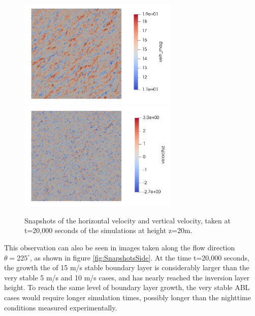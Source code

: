 \begin{figure}[hbt!]
  \includegraphics[width=3.0in]{figures/snapshots/15ms/velh_mag_z20.png}
  \includegraphics[width=3.0in]{figures/snapshots/15ms/velz_z20.png} \\
  \caption{ \label{fig:SnapshotsZ20} Snapshots of the horizontal
    velocity and vertical velocity, taken at t=20,000 seconds of the
    simulations at height z=20m.}
\end{figure}

This observation can also be seen in images taken along the flow
direction $\theta=225^\circ$, as shown in figure
\ref{fig:SnapshotsSide}.  At the time t=20,000 seconds, the growth the
of 15 m/s stable boundary layer is considerably larger than the very
stable 5 m/s and 10 m/s cases, and has nearly reached the inversion
layer height.  To reach the same level of boundary layer growth, the
very stable ABL cases would require longer simulation times, possibly
longer than the nighttime conditions measured experimentally.

